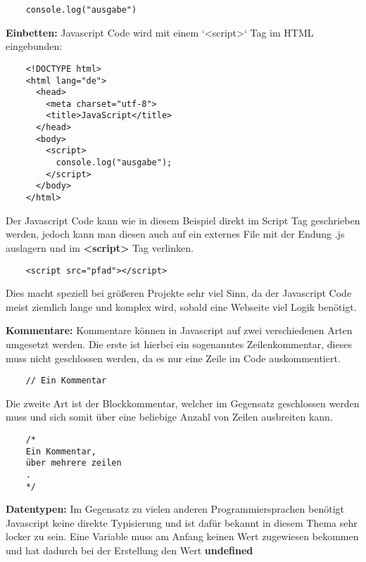 \begin{lstlisting}
    console.log("ausgabe")
\end{lstlisting}

\textbf{Einbetten:}
\newline
Javascript Code wird mit einem `<script>` Tag im HTML eingebunden:

\begin{lstlisting}
    <!DOCTYPE html>
    <html lang="de">
      <head>
        <meta charset="utf-8">
        <title>JavaScript</title>
      </head>
      <body>
        <script>
          console.log("ausgabe");
        </script>
      </body>
    </html>
\end{lstlisting}

Der Javascript Code kann wie in diesem Beispiel direkt im Script Tag geschrieben werden, jedoch kann man diesen auch auf ein externes File mit der Endung .js auslagern und im \textbf{<script>} Tag verlinken. 

\begin{lstlisting}
    <script src="pfad"></script>
\end{lstlisting}

Dies macht speziell bei größeren Projekte sehr viel Sinn, da der Javascript Code meist ziemlich lange und komplex wird, sobald eine Webseite viel Logik benötigt.

\textbf{Kommentare:}
\newline
Kommentare können in Javascript auf zwei verschiedenen Arten umgesetzt werden. Die erste ist hierbei ein sogenanntes Zeilenkommentar, dieses muss nicht geschlossen werden, da es nur eine Zeile im Code auskommentiert.

\begin{lstlisting}
    // Ein Kommentar
\end{lstlisting}

Die zweite Art ist der Blockkommentar, welcher im Gegensatz geschlossen werden muss und sich somit über eine beliebige Anzahl von Zeilen ausbreiten kann.

\begin{lstlisting}
    /*
	Ein Kommentar,
	über mehrere zeilen
	.
    */
\end{lstlisting}

\textbf{Datentypen:}
\newline
Im Gegensatz zu vielen anderen Programmiersprachen benötigt Javascript keine direkte Typisierung und ist dafür bekannt in diesem Thema sehr locker zu sein.
\newline
Eine Variable muss am Anfang keinen Wert zugewiesen bekommen und hat dadurch bei der Erstellung den Wert \textbf{undefined}


